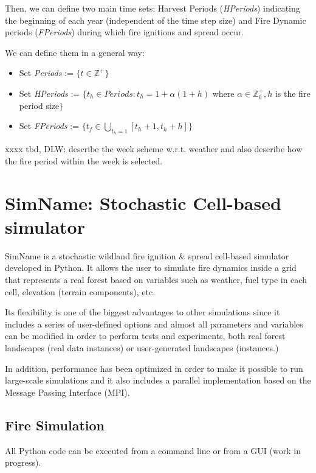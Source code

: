 \documentclass[11pt]{article}
\begin{document}
Then, we can define two main time sets: Harvest Periods
(\textit{HPeriods}) indicating the beginning of each year (independent
of the time step size) and Fire Dynamic periods (\textit{FPeriods})
during which fire ignitions and spread occur.

\newpage
We can define them in a general way:
\begin{itemize}
	\item Set \textit{Periods }:= $\lbrace \textit{t} \in \mathbb{Z^{+}} \rbrace $
	\item Set \textit{HPeriods }:= $ \lbrace t_{h} \in Periods: t_{h} = 1 + \alpha(1+h)$  where $\alpha \in \mathbb{Z}^{+}_{0}, h$ is the fire period size$\rbrace$
	\item Set \textit{FPeriods }:= $\lbrace t_{f} \in \bigcup_{t_{h}=1} [t_{h}+1,t_{h}+h] \rbrace $
\end{itemize}

xxxx tbd, DLW: describe the week scheme w.r.t. weather and also describe how the fire period
within the week is selected.

\section{SimName: Stochastic Cell-based simulator}

SimName is a stochastic wildland fire ignition \& spread cell-based simulator
developed in Python. It allows the user to simulate fire dynamics
inside a grid that represents a real forest based on
variables such as weather, fuel type in each cell, elevation (terrain
components), etc.

Its flexibility is one of the biggest advantages to other simulations
since it includes a series of user-defined options and almost all
parameters and variables can be modified in order to perform tests and
experiments, both real forest landscapes (real data instances) or user-generated
landscapes (instances.)

In addition, performance has been optimized in order to make it
possible to run large-scale simulations and it also
includes a parallel implementation based on the
Message Passing Interface (MPI).

\subsection{Fire Simulation}
	All Python code can be executed from a command line or from a GUI (work in progress).
	
\end{document}
